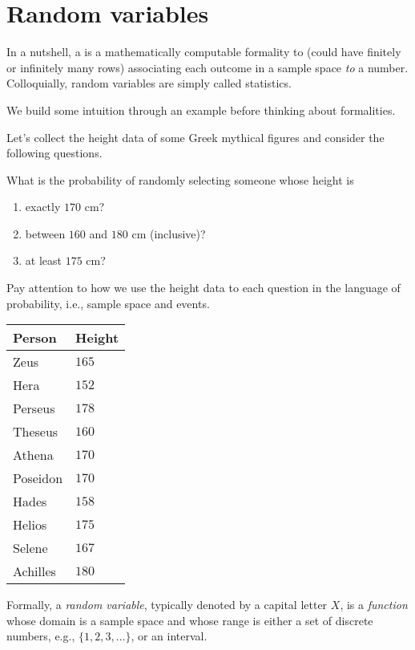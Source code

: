 \documentclass[../main.tex]{subfiles}
\begin{document}
 \section{Random variables}

In a nutshell, a  is a mathematically computable formality to  (could have finitely or infinitely many rows) associating each outcome in a sample space \emph{to} a number.  Colloquially, random variables are simply called statistics.

We build some intuition through an example before thinking about formalities. 

\begin{example} \label{ex:random-variable-intro}
  Let's collect the height data of some Greek mythical figures and consider the following questions. 

  {\color{main}
    What is the probability of randomly selecting someone whose height is 
    \begin{enumerate}
      \item exactly \(170\) cm?
      \item between \(160\) and \(180\) cm (inclusive)?
      \item at least \(175\) cm?
    \end{enumerate}
  }
  Pay attention to how we use the height data to  each question in the language of probability, i.e., sample space and events. 

  \hfill{}
  \begin{tabular}{l|l}
    Person & Height \\\midrule
    Zeus & \(165\) \\
    Hera & \(152\) \\
    Perseus & \(178\) \\
    Theseus & \(160\) \\
    Athena & \(170\) \\
    Poseidon  & \(170\) \\
    Hades & \(158\) \\
    Helios & \(175\) \\
    Selene & \(167\) \\
    Achilles & \(180\)
  \end{tabular}

\end{example}
\clearpage

Formally, a \emph{random variable}, typically denoted by a capital letter \(X\), is a \emph{function} whose domain is a sample space and whose range is either a set of discrete numbers, e.g., \(\{1,2,3,\ldots\}\), or an interval. 
\end{document}

